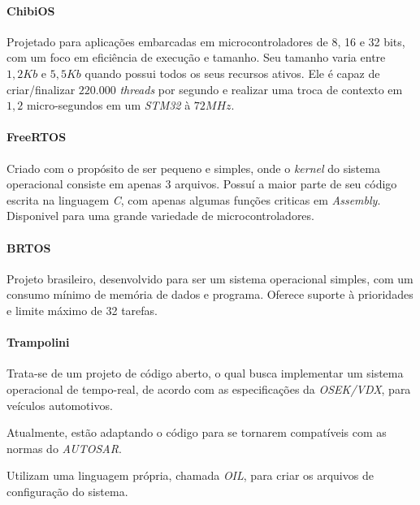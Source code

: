 \paragraph{ChibiOS}

Projetado para aplicações embarcadas em microcontroladores de 8, 16 e 32 bits, com um foco em eficiência de execução e tamanho. Seu tamanho varia entre $1,2 Kb$ e $5,5 Kb$ quando possui todos os seus recursos ativos. Ele é capaz de criar/finalizar $220.000$ \emph{threads} por segundo e realizar uma troca de contexto em $1,2$ micro-segundos em um \emph{STM32} à $72 MHz$.

\paragraph{FreeRTOS}

Criado com o propósito de ser pequeno e simples, onde o \emph{kernel} do sistema operacional consiste em apenas 3 arquivos. Possuí a maior parte de seu código escrita na linguagem \emph{C}, com apenas algumas funções criticas em \emph{Assembly}. Disponivel para uma grande variedade de microcontroladores.

\paragraph{BRTOS}

Projeto brasileiro, desenvolvido para ser um sistema operacional simples, com um consumo mínimo de memória de dados e programa. Oferece suporte à prioridades e limite máximo de 32 tarefas.

\paragraph{Trampolini}


Trata-se de um projeto de código aberto, o qual busca implementar um sistema operacional de tempo-real, de acordo com as especificações da \emph{OSEK/VDX}, para veículos automotivos.

Atualmente, estão adaptando o código para se tornarem compatíveis com as normas do \emph{AUTOSAR}.

Utilizam uma linguagem própria, chamada \emph{OIL}, para criar os arquivos de configuração do sistema.
